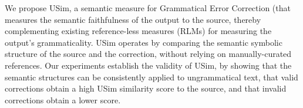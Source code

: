 We propose USim, a semantic measure for Grammatical Error Correction (that measures the semantic faithfulness of the output to the source, thereby complementing existing reference-less measures (RLMs) for measuring the output's grammaticality. USim operates by comparing the semantic symbolic structure of the source and the correction, without relying on manually-curated references. Our experiments establish the validity of {\sc USim}, by showing that the semantic structures can be consistently applied to ungrammatical text, that valid corrections obtain a high {\sc USim} similarity score to the source, and that invalid corrections obtain a lower score.
